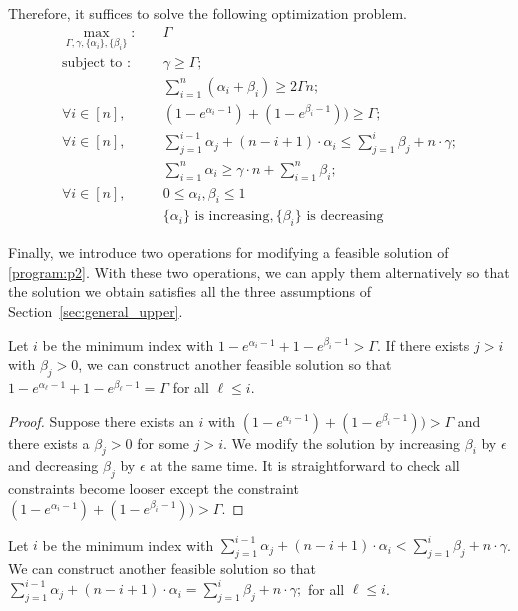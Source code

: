 Therefore, it suffices to solve the following optimization problem.
\begin{align}
\label{program:p2}
\max_{\Gamma,\gamma,\{\alpha_i\},\{\beta_i\}}: \quad  & \Gamma \tag{P2}\\
\mbox{subject to :} \quad & \gamma \ge \Gamma; \\
& \sum_{i=1}^{n} (\alpha_i + \beta_i) \ge 2 \Gamma n; \\
\label{cons:gamma}
\forall i \in [n], \quad & (1-e^{\alpha_{i}-1}) + (1-e^{\beta_i-1})) \ge \Gamma; \\
\label{cons:even}
\forall i \in [n], \quad & \sum_{j=1}^{i-1} \alpha_j + (n-i+1) \cdot \alpha_i \le \sum_{j=1}^{i} \beta_j + n \cdot \gamma; \\
	& \sum_{i=1}^{n} \alpha_i \ge \gamma \cdot n + \sum_{i=1}^{n} \beta_i; \\
\forall i \in [n], \quad & 0 \le \alpha_i, \beta_i \le 1 \\
& \{\alpha_i\} \text{ is increasing}, \{\beta_i\} \text{ is decreasing}
\end{align}

Finally, we introduce two operations for modifying a feasible solution of \eqref{program:p2}. With these two operations, we can apply them alternatively so that the solution we obtain satisfies all the three assumptions of Section~\ref{sec:general_upper}.
\begin{lemma}
Let $i$ be the minimum index with $1-e^{\alpha_i-1} + 1-e^{\beta_i-1} > \Gamma$. If there exists $j >i$ with $\beta_j > 0$, we can construct another feasible solution so that $1-e^{\alpha_\ell-1} + 1-e^{\beta_\ell-1} = \Gamma$ for all $\ell \le i$.
\end{lemma}
\begin{proof}
Suppose there exists an $i$ with $(1-e^{\alpha_{i}-1}) + (1-e^{\beta_i-1})) > \Gamma$ and there exists a $\beta_j >0$ for some $j >i$.
We modify the solution by increasing $\beta_i$ by $\epsilon$ and decreasing $\beta_j$ by $\epsilon$ at the same time. It is straightforward to check all constraints become looser except the constraint $(1-e^{\alpha_{i}-1}) + (1-e^{\beta_i-1})) > \Gamma$.
\end{proof}

\begin{lemma}
Let $i$ be the minimum index with $\sum_{j=1}^{i-1} \alpha_j + (n-i+1) \cdot \alpha_i < \sum_{j=1}^{i} \beta_j + n \cdot \gamma$. We can construct another feasible solution so that $\sum_{j=1}^{i-1} \alpha_j + (n-i+1) \cdot \alpha_i = \sum_{j=1}^{i} \beta_j + n \cdot \gamma;$ for all $\ell \le i$.
\end{lemma}

